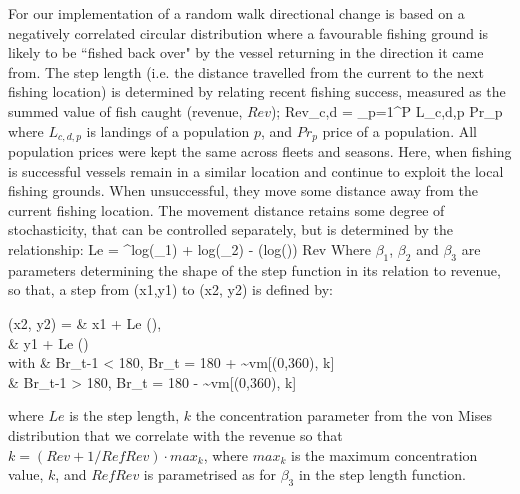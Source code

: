\documentclass[review]{elsarticle}
\let\oldequation\equation
\let\oldendequation\endequation
\renewenvironment{equation}
 {\linenomathNonumbers\oldequation}
 {\oldendequation\endlinenomath}
\begin{document}
For our implementation of a random walk directional change is based on a
negatively correlated circular distribution where a favourable fishing ground
is likely to be ``fished back over" by the vessel returning in the direction it
came from.  The step length (i.e. the distance travelled from the current to
the next fishing location) is determined by relating recent
fishing success, measured as the summed value of fish caught (revenue, $Rev$);
\begin{equation}
Rev_{c,d} = \sum_{p=1}^{P} L_{c,d,p} \cdot Pr_{p} 
\end{equation}
where $L_{c,d,p}$ is landings of a population $p$, and $Pr_{p}$ price of a
population. All population prices were kept the same across fleets and seasons.
Here, when fishing is successful vessels remain in a similar location and
continue to exploit the local fishing grounds. When unsuccessful, they move
some distance away from the current fishing location.  The movement distance
retains some degree of stochasticity, that can be controlled separately, but is
determined by the relationship: 
\begin{equation}
	Le = ^{log(\beta_{1}) + log(\beta_{2}) -
		\left(log\left(\right)\right) \cdot Rev
} 
\end{equation}
Where $\beta_{1}$, $\beta_{2}$ and $\beta_{3}$ are parameters determining the
shape of the step function in its relation to revenue, so that, a step from
(x1,y1) to (x2, y2) is defined by:
\begin{equation}
	\begin{split}
 (x2, y2) =  & x1 + Le \cdot \cos \left(\right), \\
             & y1 + Le \cdot \sin \left(\right) \\	
 with  \hspace{0.5cm}     & Br_{t-1} < 180, Br_{t} = 180 + \sim vm[(0,360), k] \\
 			  & Br_{t-1} > 180, Br_{t} = 180 - \sim vm[(0,360), k] \\
	\end{split}
\end{equation}
where $Le$ is the step length, $k$ the concentration parameter from the von
Mises distribution that we correlate with the revenue so that $k = (Rev + 1 /
RefRev) \cdot max_{k}$, where $max_{k}$ is the maximum concentration value,
$k$, and $RefRev$ is parametrised as for $\beta_{3}$ in the step length
function. 
\end{document}
